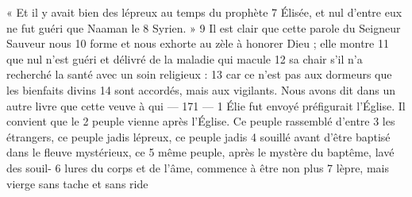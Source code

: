 « Et il y avait bien des lépreux au temps du prophète	 
7	 	Élisée, et nul d'entre eux ne fut guéri que Naaman le	 
8	 	Syrien. »	 
9	 	Il est clair que cette parole du Seigneur Sauveur nous	 
10	 	forme et nous exhorte au zèle à honorer Dieu ; elle montre	 
11	 	que nul n'est guéri et délivré de la maladie qui macule	 
12	 	sa chair s'il n'a recherché la santé avec un soin religieux :	 
13	 	car ce n'est pas aux dormeurs que les bienfaits divins	 
14	 	sont accordés, mais aux vigilants.
Nous avons dit dans un autre livre que cette veuve à qui	 
 	--- 171 ---	 
1	 	Élie fut envoyé préfigurait l'Église. Il convient que le	 
2	 	peuple vienne après l'Église. Ce peuple rassemblé d'entre	 
3	 	les étrangers, ce peuple jadis lépreux, ce peuple jadis	 
4	 	souillé avant d'être baptisé dans le fleuve mystérieux, ce	 
5	 	même peuple, après le mystère du baptême, lavé des souil-	 
6	 	lures du corps et de l'âme, commence à être non plus	 
7	 	lèpre, mais vierge sans tache et sans ride